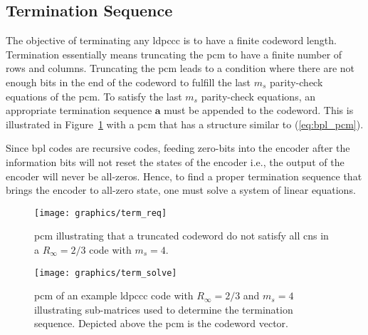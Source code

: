 \subsection{Termination Sequence}\label{sec:bpl_termi}
The objective of terminating any \ac{ldpccc} is to have a finite codeword length. Termination essentially means truncating the \ac{pcm} to have a finite number of rows and columns. Truncating the \ac{pcm} leads to a condition where there are not enough bits in the end of the codeword to fulfill the last $m_s$ parity-check equations of the \ac{pcm}. To satisfy the last $m_s$ parity-check equations, an appropriate termination sequence $\mathbf{a}$ must be appended to the codeword. This is illustrated in Figure~\ref{fig:term_req} with a \ac{pcm} that has a structure similar to (\ref{eq:bpl_pcm}).

Since \ac{bpl} codes are recursive codes, feeding zero-bits into the encoder after the information bits will not reset the states of the encoder i.e., the output of the encoder will never be all-zeros. Hence, to find a proper termination sequence that brings the encoder to all-zero state, one must solve a system of linear equations.

\begin{figure}[htbp]
  \centering
  \texttt{[image: graphics/term\_req]}
  \caption{\ac{pcm} illustrating that a truncated codeword do not satisfy all \acp{cn} in a $R_\infty=2/3$ code with $m_s=4$.}
  \label{fig:term_req}
\end{figure}

\begin{figure}[htbp]
  \centering
  \texttt{[image: graphics/term\_solve]}
  \caption{\ac{pcm} of an example \ac{ldpccc} code with $R_\infty=2/3$ and $m_s=4$ illustrating sub-matrices used to determine the termination sequence. Depicted above the \ac{pcm} is the codeword vector.}
  \label{fig:bpl_term}
\end{figure}

